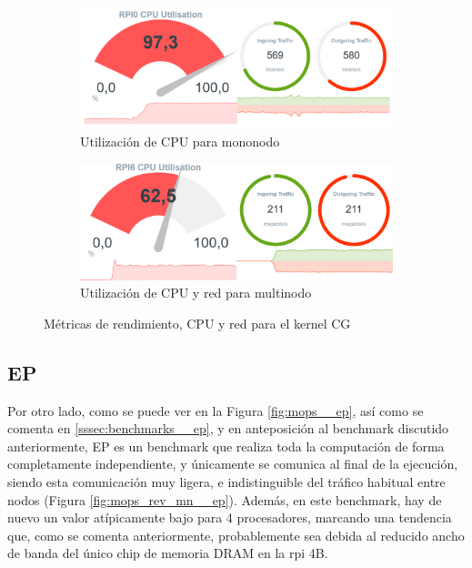 \begin{figure}[h!]
    \begin{subfigure}[c]{0.75\textwidth}
        \includegraphics[width=\textwidth]{img/benchmark_rev/cg_rev_sn.png}
        \caption{Utilización de CPU para mononodo}
        \label{fig:mops_rev_sn__cg}
    \end{subfigure}

    \vspace{0.5cm}
    
    \begin{subfigure}[c]{0.75\textwidth}
        \includegraphics[width=\textwidth]{img/benchmark_rev/cg_rev_mn.png}
        \caption{Utilización de CPU y red para multinodo}
        \label{fig:mops_rev_mn__cg}
    \end{subfigure}
    \caption{Métricas de rendimiento, CPU y red para el kernel CG}
    \label{fig:mops__cg}
\end{figure}

\subsection{EP}
\label{ssec:comparacion_resultados__ep}
Por otro lado, como se puede ver en la Figura \ref{fig:mops__ep}, así como se comenta en \ref{sssec:benchmarks__ep}, y en anteposición al benchmark discutido anteriormente, EP es un benchmark que realiza toda la computación de forma completamente independiente, y únicamente se comunica al final de la ejecución, siendo esta comunicación muy ligera, e indistinguible del tráfico habitual entre nodos (Figura \ref{fig:mops_rev_mn__ep}). Además, en este benchmark, hay de nuevo un valor atípicamente bajo para 4 procesadores, marcando una tendencia que, como se comenta anteriormente, probablemente sea debida al reducido ancho de banda del único chip de memoria DRAM en la \acrlong{rpi} 4B.


